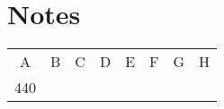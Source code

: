 \section{Notes}
\begin{tabular}{ c c c c c c c c }
	A & B & C & D & E & F & G & H \\
	440
\end{tabular}

\begin{tabular}{ c c c c c c c c }
\end{tabular}